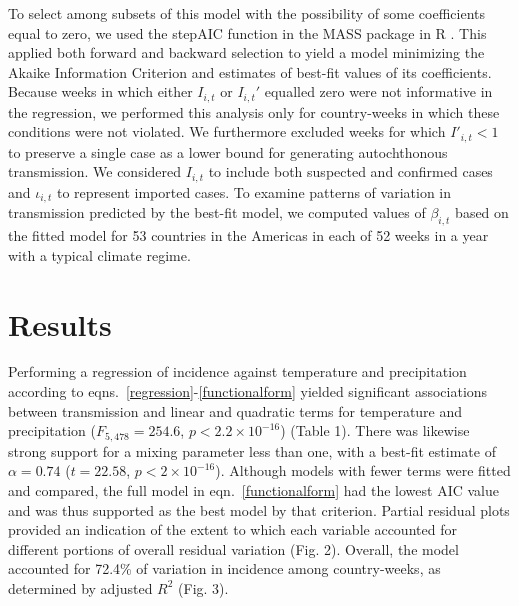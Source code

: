 \documentclass[11pt]{article}
\begin{document}
\noindent To select among subsets of this model with the possibility of some coefficients equal to zero, we used the stepAIC function in the MASS package \cite{MASS} in R \cite{R}. This applied both forward and backward selection to yield a model minimizing the Akaike Information Criterion and estimates of best-fit values of its coefficients. Because weeks in which either $I_{i,t}$ or $I_{i,t}'$ equalled zero were not informative in the regression, we performed this analysis only for country-weeks in which these conditions were not violated. We furthermore excluded weeks for which $I'_{i,t}<1$ to preserve a single case as a lower bound for generating autochthonous transmission. We considered $I_{i,t}$ to include both suspected and confirmed cases and $\iota_{i,t}$ to represent imported cases. To examine patterns of variation in transmission predicted by the best-fit model, we computed values of $\beta_{i,t}$ based on the fitted model for 53 countries in the Americas in each of 52 weeks in a year with a typical climate regime.

\section*{Results}
Performing a regression of incidence against temperature and precipitation according to eqns.~\eqref{regression}-\eqref{functionalform} yielded significant associations between transmission and linear and quadratic terms for temperature and precipitation ($F_{5,478}=254.6$, $p<2.2\times 10^{-16}$) (Table 1). There was likewise strong support for a mixing parameter less than one, with a best-fit estimate of $\alpha=0.74$ ($t=22.58$, $p<2\times 10^{-16}$). Although models with fewer terms were fitted and compared, the full model in eqn.~\eqref{functionalform} had the lowest AIC value and was thus supported as the best model by that criterion. Partial residual plots provided an indication of the extent to which each variable accounted for different portions of overall residual variation (Fig. 2). Overall, the model accounted for 72.4\% of variation in incidence among country-weeks, as determined by adjusted $R^2$ (Fig. 3).
\end{document}
